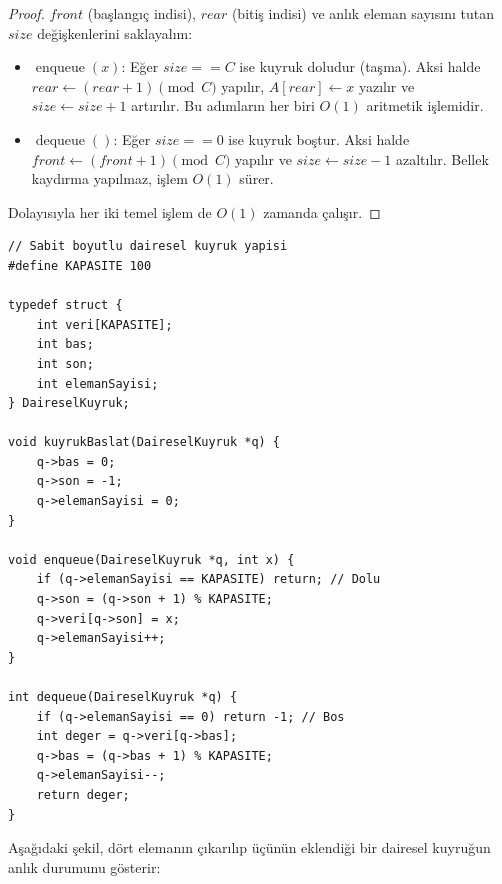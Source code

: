 \begin{proof}
$front$ (başlangıç indisi), $rear$ (bitiş indisi) ve anlık eleman sayısını tutan $size$ değişkenlerini saklayalım:
\begin{itemize}
    \item $\operatorname{enqueue}(x)$: Eğer $size == C$ ise kuyruk doludur (taşma). Aksi halde $rear \leftarrow (rear + 1) \pmod C$ yapılır, $A[rear] \leftarrow x$ yazılır ve $size \leftarrow size + 1$ artırılır. Bu adımların her biri $O(1)$ aritmetik işlemidir.
    \item $\operatorname{dequeue}()$: Eğer $size == 0$ ise kuyruk boştur. Aksi halde $front \leftarrow (front + 1) \pmod C$ yapılır ve $size \leftarrow size - 1$ azaltılır. Bellek kaydırma yapılmaz, işlem $O(1)$ sürer.
\end{itemize}
Dolayısıyla her iki temel işlem de $O(1)$ zamanda çalışır.
\end{proof}

\begin{lstlisting}[language=CTemel]
// Sabit boyutlu dairesel kuyruk yapisi
#define KAPASITE 100

typedef struct {
    int veri[KAPASITE];
    int bas;
    int son;
    int elemanSayisi;
} DaireselKuyruk;

void kuyrukBaslat(DaireselKuyruk *q) {
    q->bas = 0;
    q->son = -1;
    q->elemanSayisi = 0;
}

void enqueue(DaireselKuyruk *q, int x) {
    if (q->elemanSayisi == KAPASITE) return; // Dolu
    q->son = (q->son + 1) % KAPASITE;
    q->veri[q->son] = x;
    q->elemanSayisi++;
}

int dequeue(DaireselKuyruk *q) {
    if (q->elemanSayisi == 0) return -1; // Bos
    int deger = q->veri[q->bas];
    q->bas = (q->bas + 1) % KAPASITE;
    q->elemanSayisi--;
    return deger;
}
\end{lstlisting}

Aşağıdaki şekil, dört elemanın çıkarılıp üçünün eklendiği bir dairesel kuyruğun
anlık durumunu gösterir:

